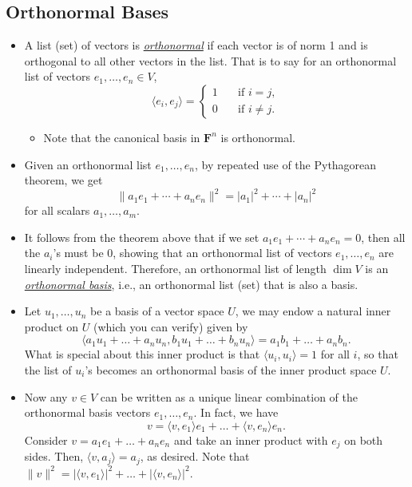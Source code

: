 \documentclass{article}
\newcommand{\df}[1]{\ul{\textit{#1}}}
\newcommand{\F}{\mathbf{F}}
\renewcommand{\d}{\dim}
\newcommand{\inp}[2]{\langle #1, #2 \rangle}
\newcommand{\nm}[1]{\| #1 \|}
\begin{document}
\subsection{Orthonormal Bases}
\begin{itemize}
    \item A list (set) of vectors is \df{orthonormal} if each vector is of norm 1 and is orthogonal to all other vectors in the list. That is to say for an orthonormal list of vectors $e_1,\dots,e_n \in V$,
    \begin{equation*}
    \inp{e_i}{e_j} = 
        \left\{
            \begin{array}{rl}
                1 \quad & \text{if } i = j, \\
                0 \quad & \text{if } i \not= j.
            \end{array}
        \right.
    \end{equation*}
    \begin{itemize}
        \item Note that the canonical basis in $\F^n$ is orthonormal.
    \end{itemize}
    \item Given an orthonormal list $e_1,\dots,e_n$, by repeated use of the Pythagorean theorem, we get $$\nm{a_1 e_1 + \cdots + a_n e_n}^2 = |a_1|^2 + \cdots + |a_n|^2$$ for all scalars $a_1, \dots, a_m$.
    \item It follows from the theorem above that if we set $a_1 e_1 + \cdots + a_n e_n = 0$, then all the $a_i$'s must be 0, showing that an orthonormal list of vectors $e_1,\dots,e_n$ are linearly independent. Therefore, an orthonormal list of length $\d V$ is an \df{orthonormal basis}, i.e., an orthonormal list (set) that is also a basis.
    \item Let $u_1,\dots,u_n$ be a basis of a vector space $U$, we may endow a natural inner product on $U$ (which you can verify) given by $$\inp{a_1u_1+\dots+a_nu_n}{b_1u_1+\dots+b_nu_n}=a_1b_1+\dots+a_nb_n.$$ What is special about this inner product is that $\inp{u_i}{u_i} = 1$ for all $i$, so that the list of $u_i$'s becomes an orthonormal basis of the inner product space $U$.
    \item Now any $v \in V$ can be written as a unique linear combination of the orthonormal basis vectors $e_1,\dots,e_n$. In fact, we have $$v = \inp{v}{e_1}e_1 + \dots + \inp{v}{e_n}e_n.$$
    Consider $v = a_1 e_1 + \dots + a_n e_n$ and take an inner product with $e_j$ on both sides. Then, $\inp{v}{a_j} = a_j$, as desired. Note that $\nm{v}^2 = |\inp{v}{e_1}|^2 + \dots + |\inp{v}{e_n}|^2$.

\end{itemize}
\end{document}

